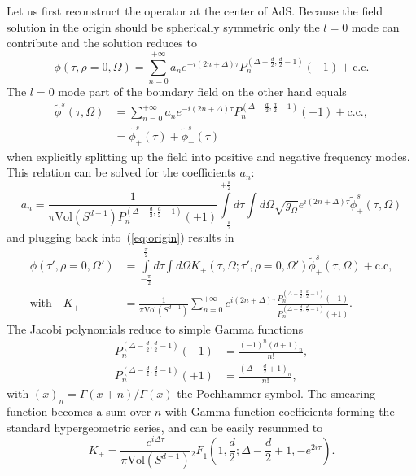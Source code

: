 \documentclass{PoS}
\newcommand{\LF}{\left(}
\newcommand{\RF}{\right)}
\begin{document}
Let us first reconstruct the operator at the center of AdS. Because the field solution in the origin should be spherically symmetric only the $l=0$ mode can contribute and the solution reduces to
\begin{equation} 
\phi(\tau,\rho=0,\Omega) = \sum\limits_{n=0}^{+\infty} a_n e^{-i(2n+\Delta)\tau} P_n^{(\Delta-\frac{d}{2},\frac{d}{2}-1)} (-1) + \text{c.c}.
\label{eq:origin}
\end{equation}
The $l=0$ mode part of the boundary field on the other hand equals
\begin{align}
\tilde{\phi}^s (\tau,\Omega) &= \sum\limits_{n=0}^{+\infty} a_n e^{-i (2n+\Delta)\tau} P_n^{(\Delta -\frac{d}{2},\frac{d}{2}-1)}(+1) +\text{c.c.},\\
&= \tilde{\phi}_+^s (\tau) + \tilde{\phi}_-^s (\tau)
\end{align}
when explicitly splitting up the field into positive and negative frequency modes. This relation can be solved for the coefficients $a_n$:
\begin{equation}
a_n = \frac{1}{\pi \text{Vol}(S^{d-1}) P_n^{(\Delta- \frac{d}{2}, \frac{d}{2}-1)} (+1)} \int\limits_{-\frac{\pi}{2}}^{+\frac{\pi}{2}} d\tau \int d\Omega \sqrt{g_\Omega} e^{i(2n+\Delta)\tau} \tilde{\phi}_+^s (\tau,\Omega)
\end{equation}
and plugging back into~(\ref{eq:origin}) results in
\begin{align}
\phi(\tau',\rho=0,\Omega') &= \int\limits_{-\frac{\pi}{2}}^{\frac{\pi}{2}} d\tau \int\limits d\Omega K_+ (\tau,\Omega; \tau',\rho=0,\Omega') \tilde{\phi}_+^s (\tau,\Omega) + \text{c.c},\label{eq:ReconstructCenter}\\
\text{with} \quad K_+ &= \frac{1}{\pi \text{Vol}(S^{d-1})}\sum\limits_{n=0}^{+\infty} e^{i (2n+\Delta)\tau} \frac{ P_n^{(\Delta-\frac{d}{2},\frac{d}{2}-1)}(-1)}{P_n^{(\Delta-\frac{d}{2},\frac{d}{2}-1)}(+1)}.
\end{align}
The Jacobi polynomials reduce to simple Gamma functions
\begin{align}
P_n^{(\Delta-\frac{d}{2}, \frac{d}{2}-1)} (-1) &= \frac{(-1)^n (d+1)_n}{n!},\\
P_n^{(\Delta-\frac{d}{2}, \frac{d}{2}-1)} (+1) &= \frac{ \LF \Delta - \frac{d}{2}+1\RF_n}{n!},
\end{align}
with $(x)_n= \Gamma(x+n)/\Gamma (x)$ the Pochhammer symbol. The smearing function becomes a sum over $n$ with Gamma function coefficients forming the standard hypergeometric series, and can be easily resummed to
\begin{equation}
K_+ = \frac{ e^{i\Delta \tau}}{\pi \text{Vol}(S^{d-1})} \left._2 F \right._1\LF 1,\frac{d}{2}; \Delta-\frac{d}{2}+1,-e^{2i\tau}\RF.
\end{equation} 
\end{document}
